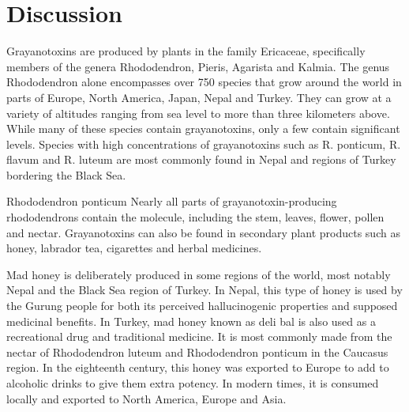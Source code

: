 \documentclass[11pt]{article}
\begin{document}
\section{Discussion}\label{ss:discuss}
Grayanotoxins are produced by plants in the family Ericaceae,
specifically members of the genera Rhododendron, Pieris, Agarista
and Kalmia. The genus Rhododendron alone encompasses over 750
species that grow around the world in parts of Europe, North America,
Japan, Nepal and Turkey. They can grow at a variety of altitudes
ranging from sea level to more than three kilometers above. While
many of these species contain grayanotoxins, only a few contain
significant levels. Species with high concentrations of grayanotoxins
such as R. ponticum, R. flavum and R. luteum are most commonly found
in Nepal and regions of Turkey bordering the Black Sea.

Rhododendron ponticum Nearly all parts of grayanotoxin-producing
rhododendrons contain the molecule, including the stem, leaves,
flower, pollen and nectar. Grayanotoxins can also be found in
secondary plant products such as honey, labrador tea, cigarettes
and herbal medicines.

Mad honey is deliberately produced in some regions of the world,
most notably Nepal and the Black Sea region of Turkey. In Nepal,
this type of honey is used by the Gurung people for both its perceived
hallucinogenic properties and supposed medicinal benefits. In
Turkey, mad honey known as deli bal is also used as a recreational
drug and traditional medicine. It is most commonly made from the
nectar of Rhododendron luteum and Rhododendron ponticum in the
Caucasus region. In the eighteenth century, this honey was
exported to Europe to add to alcoholic drinks to give them extra
potency. In modern times, it is consumed locally and exported to
North America, Europe and Asia.
\end{document}
